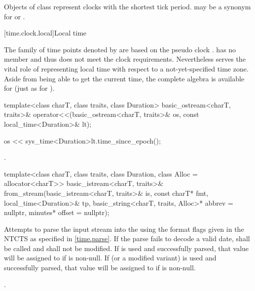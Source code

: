\pnum
Objects of class  represent clocks with the
shortest tick period.  may be a synonym for
 or .

[time.clock.local]{Local time}
%

\pnum
The family of time points
denoted by 
are based on the pseudo clock .
 has no member 
and thus does not meet the clock requirements.
Nevertheless  serves the vital role of
representing local time with respect to a not-yet-specified time zone.
Aside from being able to get the current time,
the complete  algebra is available
for  (just as for ).

%
\begin{itemdecl}
template<class charT, class traits, class Duration>
  basic_ostream<charT, traits>&
    operator<<(basic_ostream<charT, traits>& os, const local_time<Duration>& lt);
\end{itemdecl}

\begin{itemdescr}
\pnum
\effects
\begin{codeblock}
os << sys_time<Duration>{lt.time_since_epoch()};
\end{codeblock}

\pnum
\returns
{}.
\end{itemdescr}

%
\begin{itemdecl}
template<class charT, class traits, class Duration, class Alloc = allocator<charT>>
  basic_istream<charT, traits>&
    from_stream(basic_istream<charT, traits>& is, const charT* fmt,
                local_time<Duration>& tp, basic_string<charT, traits, Alloc>* abbrev = nullptr,
                minutes* offset = nullptr);
\end{itemdecl}

\begin{itemdescr}
\pnum
\effects
Attempts to parse the input stream 
into the   using
the format flags given in the NTCTS 
as specified in \ref{time.parse}.
If the parse fails to decode a valid date,
 shall be called
and  shall not be modified.
If  is used and successfully parsed,
that value will be assigned to  if  is non-null.
If  (or a modified variant) is used and successfully parsed,
that value will be assigned to  if  is non-null.

\pnum
\returns
{}.
\end{itemdescr}

